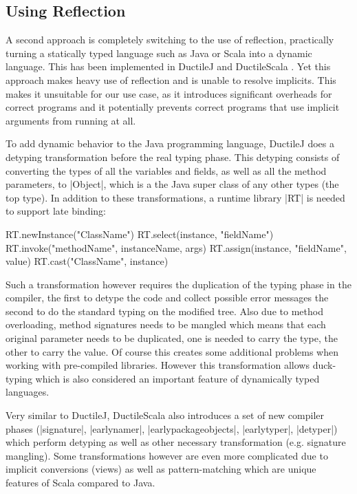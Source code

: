 \subsection{Using Reflection}

A second approach is completely switching to the use of reflection, practically turning a statically typed language such as Java or Scala into a dynamic language. This has been implemented in DuctileJ and DuctileScala \cite{ductilej,ductilescala}. Yet this approach makes heavy use of reflection and is unable to resolve implicits. This makes it unsuitable for our use case, as it introduces significant overheads for correct programs and it potentially prevents correct programs that use implicit arguments from running at all.

To add dynamic behavior to the Java programming language, DuctileJ \cite{ductilej} does a detyping transformation before the real typing phase. This detyping consists of converting the types of all the variables and fields, as well as all the method parameters, to |Object|, which is a the Java super class of any other types (the top type). In addition to these transformations, a runtime library |RT| is needed to support late binding:

\begin{lstlisting-nobreak}
RT.newInstance("ClassName")
RT.select(instance, "fieldName")
RT.invoke("methodName", instanceName, args)
RT.assign(instance, "fieldName", value)
RT.cast("ClassName", instance)
\end{lstlisting-nobreak}

Such a transformation however requires the duplication of the typing phase in the compiler, the first to detype the code and collect possible error messages the second to do the standard typing on the modified tree. Also due to method overloading, method signatures needs to be mangled which means that each original parameter needs to be duplicated, one is needed to carry the type, the other to carry the value. Of course this creates some additional problems when working with pre-compiled libraries. However this transformation allows duck-typing which is also considered an important feature of dynamically typed languages.

Very similar to DuctileJ, DuctileScala \cite{ductilescala} also introduces a set of new compiler phases (|signature|, |earlynamer|, |earlypackageobjects|, |earlytyper|, |detyper|) which perform detyping as well as other necessary transformation (e.g. signature mangling). Some transformations however are even more complicated due to implicit conversions (views) as well as pattern-matching which are unique features of Scala compared to Java.

